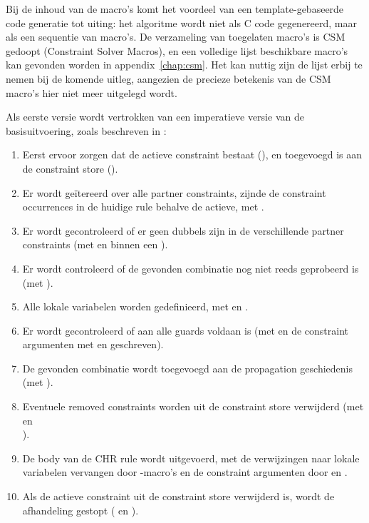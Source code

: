 Bij de inhoud van de macro's komt het voordeel van een template-gebaseerde code generatie tot uiting: het algoritme wordt niet als C code gegenereerd, maar als een sequentie van macro's. De verzameling van toegelaten macro's is CSM gedoopt (Constraint Solver Macros), en een volledige lijst beschikbare macro's kan gevonden worden in appendix~\ref{chap:csm}. Het kan nuttig zijn de lijst erbij te nemen bij de komende uitleg, aangezien de precieze betekenis van de CSM macro's hier niet meer uitgelegd wordt.

Als eerste versie wordt vertrokken van een imperatieve versie van de basisuitvoering, zoals beschreven in \cite{tomsphdthesis}:
\begin{enumerate}
  \item Eerst ervoor zorgen dat de actieve constraint bestaat (), en toegevoegd is aan de constraint store ().
  \item Er wordt ge\"itereerd over alle partner constraints, zijnde de constraint occurrences in de huidige rule behalve de actieve, met .
  \item Er wordt gecontroleerd of er geen dubbels zijn in de verschillende partner constraints (met  en  binnen een ).
  \item Er wordt controleerd of de gevonden combinatie nog niet reeds geprobeerd is (met ).
  \item Alle lokale variabelen worden gedefinieerd, met  en .
  \item Er wordt gecontroleerd of aan alle guards voldaan is (met  en de constraint argumenten met  en  geschreven).
  \item De gevonden combinatie wordt toegevoegd aan de propagation geschiedenis (met ).
  \item Eventuele removed constraints worden uit de constraint store verwijderd (met  en \\ ).
  \item De body van de CHR rule wordt uitgevoerd, met de verwijzingen naar lokale variabelen vervangen door -macro's en de constraint argumenten door  en .
  \item Als de actieve constraint uit de constraint store verwijderd is, wordt de afhandeling gestopt ( en ).
\end{enumerate}

